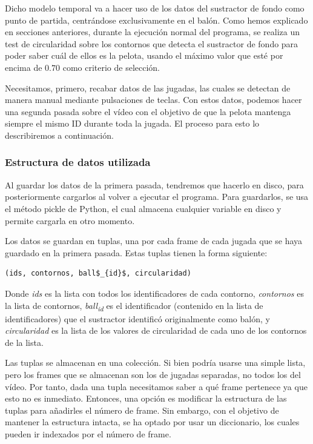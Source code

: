 Dicho modelo temporal va a hacer uso de los datos del sustractor de fondo como punto de partida, centrándose exclusivamente en el balón. Como hemos explicado en secciones anteriores, durante la ejecución normal del programa, se realiza un test de circularidad sobre los contornos que detecta el sustractor de fondo para poder saber cuál de ellos es la pelota, usando el máximo valor que esté por encima de $0.70$ como criterio de selección.

Necesitamos, primero, recabar datos de las jugadas, las cuales se detectan de manera manual mediante pulsaciones de teclas. Con estos datos, podemos hacer una segunda pasada sobre el vídeo con el objetivo de que la pelota mantenga siempre el mismo ID durante toda la jugada. El proceso para esto lo describiremos a continuación.

\subsubsection*{Estructura de datos utilizada}

Al guardar los datos de la primera pasada, tendremos que hacerlo en disco, para posteriormente cargarlos al volver a ejecutar el programa. Para guardarlos, se usa el método pickle de Python, el cual almacena cualquier variable en disco y permite cargarla en otro momento.

Los datos se guardan en tuplas, una por cada frame de cada jugada que se haya guardado en la primera pasada. Estas tuplas tienen la forma siguiente:
  
\begin{lstlisting}[mathescape]
  (ids, contornos, ball$_{id}$, circularidad)
\end{lstlisting}

Donde \textit{ids} es la lista con todos los identificadores de cada contorno, \textit{contornos} es la lista de contornos, \textit{ball\textsubscript{id}} es el identificador (contenido en la lista de identificadores) que el sustractor identificó originalmente como balón, y \textit{circularidad} es la lista de los valores de circularidad de cada uno de los contornos de la lista.

Las tuplas se almacenan en una colección. Si bien podría usarse una simple lista, pero los frames que se almacenan son los de jugadas separadas, no todos los del vídeo. Por tanto, dada una tupla necesitamos saber a qué frame pertenece ya que esto no es inmediato. Entonces, una opción es modificar la estructura de las tuplas para añadirles el número de frame. Sin embargo, con el objetivo de mantener la estructura intacta, se ha optado por usar un diccionario, los cuales pueden ir indexados por el número de frame.

